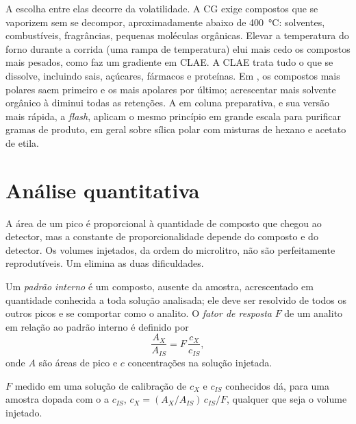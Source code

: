 A escolha entre elas decorre da volatilidade. A CG exige compostos que se vaporizem sem se decompor,
aproximadamente abaixo de \qty{400}{\degreeCelsius}: solventes, combustíveis, fragrâncias, pequenas
moléculas orgânicas. Elevar a temperatura do forno durante a corrida (uma rampa de temperatura) elui
mais cedo os compostos mais pesados, como faz um gradiente em CLAE. A CLAE trata tudo o que se
dissolve, incluindo sais, açúcares, fármacos e proteínas. Em , os compostos mais polares
saem primeiro e os mais apolares por último; acrescentar mais solvente orgânico à  diminui
todas as retenções. A  em coluna preparativa, e sua versão mais rápida, a 
\textit{flash}, aplicam o mesmo princípio em grande escala para purificar gramas de produto, em geral
sobre sílica polar com misturas de hexano e acetato de etila.

\section{Análise quantitativa}

A área de um pico é proporcional à quantidade de composto que chegou ao detector, mas a constante de
proporcionalidade depende do composto e do detector. Os volumes injetados, da ordem do microlitro, não
são perfeitamente reprodutíveis. Um  elimina as duas dificuldades.

\begin{definition}\label{def:b2:chromatography:quantitative}
Um \emph{padrão interno} é um composto, ausente da amostra, acrescentado em
quantidade conhecida a toda solução analisada; ele deve ser resolvido de todos os outros picos e se
comportar como o analito. O \emph{fator de resposta} $F$ de um analito em relação
ao padrão interno é definido por
\begin{equation*}
\frac{A_X}{A_{IS}} = F\,\frac{c_X}{c_{IS}},
\end{equation*}
onde $A$ são áreas de pico e $c$ concentrações na solução injetada.
\end{definition}

\begin{proposition}\label{prop:b2:chromatography:internal-standard}
$F$ medido em uma solução de calibração de $c_X$ e $c_{IS}$ conhecidos dá, para uma amostra dopada com o
 a $c_{IS}$, $c_X = (A_X/A_{IS})\,c_{IS}/F$, qualquer que seja o volume injetado.
\end{proposition}

